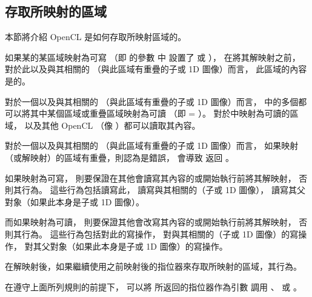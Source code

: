 \subsection{存取所映射的區域}

本節將介紹 OpenCL 是如何存取所映射區域的。

如果某的某區域映射為可寫
（即  的參數  中
設置了  或  ），
在將其解映射之前，
對於此以及與其相關的
（與此區域有重疊的子或 1D 圖像）而言，
此區域的內容是的。

對於一個以及與其相關的
（與此區域有重疊的子或 1D 圖像）而言，
中的多個都可以將其中某個區域或重疊區域映射為可讀
（即  = ）。
對於中映射為可讀的區域，
以及其他 OpenCL （像 ）都可以讀取其內容。

對於一個以及與其相關的
（與此區域有重疊的子或 1D 圖像）而言，
如果映射（或解映射）的區域有重疊，則認為是錯誤，
會導致  返回 。

如果映射為可寫，
則要保證在其他會讀寫其內容的或開始執行前將其解映射，
否則其行為。
這些行為包括讀寫此，
讀寫與其相關的（子或 1D 圖像），
讀寫其父對象（如果此本身是子或 1D 圖像）。

而如果映射為可讀，
則要保證其他會改寫其內容的或開始執行前將其解映射，
否則其行為。
這些行為包括對此的寫操作，
對與其相關的（子或 1D 圖像）的寫操作，
對其父對象（如果此本身是子或 1D 圖像）的寫操作。

在解映射後，如果繼續使用之前映射後的指位器來存取所映射的區域，其行為。

在遵守上面所列規則的前提下，
可以將  所返回的指位器作為引數  調用
、
或 。
